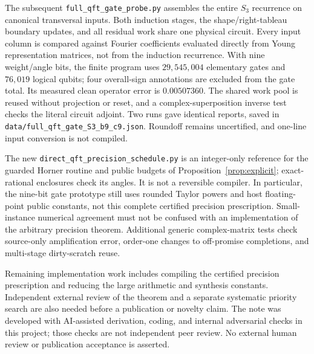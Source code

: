 \documentclass[11pt]{article}
\theoremstyle{definition}
\begin{document}
The subsequent \texttt{full\_qft\_gate\_probe.py} assembles the entire
$S_3$ recurrence on canonical transversal inputs. Both induction stages,
the shape/right-tableau boundary updates, and all residual work share one
physical circuit. Every input column is compared against Fourier
coefficients evaluated directly from Young representation matrices, not
from the induction recurrence. With nine weight/angle bits, the finite
program uses $29{,}545{,}004$ elementary gates and $76{,}019$ logical qubits;
four overall-sign annotations are excluded from the gate total. Its measured
clean operator error is $0.00507360$. The shared work pool is reused without
projection or reset, and a complex-superposition inverse test checks the
literal circuit adjoint. Two runs gave identical reports, saved in
\texttt{data/full\_qft\_gate\_S3\_b9\_c9.json}. Roundoff remains
uncertified, and one-line input conversion is not compiled.

The new \texttt{direct\_qft\_precision\_schedule.py} is an integer-only
reference for the guarded Horner routine and public budgets of
Proposition~\ref{prop:explicit}; exact-rational enclosures check its angles.
It is not a reversible compiler. In particular, the nine-bit gate prototype
still uses rounded Taylor powers and host floating-point public constants,
not this complete certified precision prescription. Small-instance numerical
agreement must not be confused with an implementation of the arbitrary
precision theorem. Additional generic complex-matrix tests check
source-only amplification error, order-one changes to off-promise
completions, and multi-stage dirty-scratch reuse.

Remaining implementation work includes compiling the certified precision
prescription and reducing the large arithmetic and synthesis constants.
Independent external review of the theorem and a separate systematic
priority search are also needed before a publication or novelty claim.
The note was developed with
AI-assisted derivation, coding, and internal adversarial checks in this
project; those checks are not independent peer review. No external human
review or publication acceptance is asserted.
\end{document}
